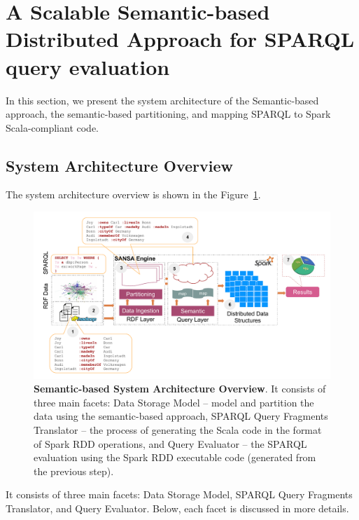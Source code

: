 
\section{A Scalable Semantic-based Distributed Approach for SPARQL query evaluation}
\label{sec:semantic-based-approach}

In this section, we present the system architecture of the Semantic-based approach, the semantic-based partitioning, and mapping \gls{SPARQL} to Spark Scala-compliant code.

\subsection{System Architecture Overview}
The system architecture overview is shown in the Figure~\ref{fig:semantic-based-architecture}.

\begin{figure}
\centering
\includegraphics[width=1.0\columnwidth]{images/6_scalable_rdf_querying/semantic-based-architecture.pdf}
\caption{\textbf{Semantic-based System Architecture Overview}.
It consists of three main facets: Data Storage Model -- model and partition the data using the semantic-based approach, SPARQL Query Fragments Translator -- the process of generating the Scala code in the format of Spark RDD operations, and Query Evaluator -- the SPARQL evaluation using the Spark RDD executable code (generated from the previous step).}
\label{fig:semantic-based-architecture}
\end{figure}

It consists of three main facets: Data Storage Model, \gls{SPARQL} Query Fragments Translator, and Query Evaluator.
Below, each facet is discussed in more details.

